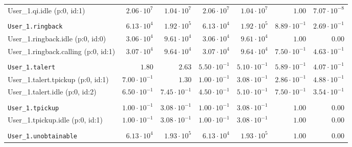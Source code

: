 \begin{table}[htbp]
{\begin{tabular}{lrrrrrr}
\hspace{3mm}User\_1.qi.idle (p:0, id:1)              &  $2.06 \cdot 10^{7}$ &  $1.04 \cdot 10^{7}$ &  $2.06 \cdot 10^{7}$ &  $1.04 \cdot 10^{7}$ &               $1.00$ & $7.07 \cdot 10^{-8}$ \\
\\[-8pt]\texttt{User\_1.ringback}                    &  $6.13 \cdot 10^{4}$ &  $1.92 \cdot 10^{5}$ &  $6.13 \cdot 10^{4}$ &  $1.92 \cdot 10^{5}$ & $8.89 \cdot 10^{-1}$ & $2.69 \cdot 10^{-1}$ \\
\hspace{3mm}User\_1.ringback.idle (p:0, id:0)        &  $3.06 \cdot 10^{4}$ &  $9.61 \cdot 10^{4}$ &  $3.06 \cdot 10^{4}$ &  $9.61 \cdot 10^{4}$ &               $1.00$ &               $0.00$ \\
\hspace{3mm}User\_1.ringback.calling (p:0, id:1)     &  $3.07 \cdot 10^{4}$ &  $9.64 \cdot 10^{4}$ &  $3.07 \cdot 10^{4}$ &  $9.64 \cdot 10^{4}$ & $7.50 \cdot 10^{-1}$ & $4.63 \cdot 10^{-1}$ \\
\\[-8pt]\texttt{User\_1.talert}                      &               $1.80$ &               $2.63$ & $5.50 \cdot 10^{-1}$ & $5.10 \cdot 10^{-1}$ & $5.89 \cdot 10^{-1}$ & $4.07 \cdot 10^{-1}$ \\
\hspace{3mm}User\_1.talert.tpickup (p:0, id:1)       & $7.00 \cdot 10^{-1}$ &               $1.30$ & $1.00 \cdot 10^{-1}$ & $3.08 \cdot 10^{-1}$ & $2.86 \cdot 10^{-1}$ & $4.88 \cdot 10^{-1}$ \\
\hspace{3mm}User\_1.talert.idle (p:0, id:2)          & $6.50 \cdot 10^{-1}$ & $7.45 \cdot 10^{-1}$ & $4.50 \cdot 10^{-1}$ & $5.10 \cdot 10^{-1}$ & $7.50 \cdot 10^{-1}$ & $3.54 \cdot 10^{-1}$ \\
\\[-8pt]\texttt{User\_1.tpickup}                     & $1.00 \cdot 10^{-1}$ & $3.08 \cdot 10^{-1}$ & $1.00 \cdot 10^{-1}$ & $3.08 \cdot 10^{-1}$ &               $1.00$ &               $0.00$ \\
\hspace{3mm}User\_1.tpickup.idle (p:0, id:1)         & $1.00 \cdot 10^{-1}$ & $3.08 \cdot 10^{-1}$ & $1.00 \cdot 10^{-1}$ & $3.08 \cdot 10^{-1}$ &               $1.00$ &               $0.00$ \\
\\[-8pt]\texttt{User\_1.unobtainable}                &  $6.13 \cdot 10^{4}$ &  $1.93 \cdot 10^{5}$ &  $6.13 \cdot 10^{4}$ &  $1.93 \cdot 10^{5}$ &               $1.00$ &               $0.00$ \\

\end{tabular}}
\end{table}
